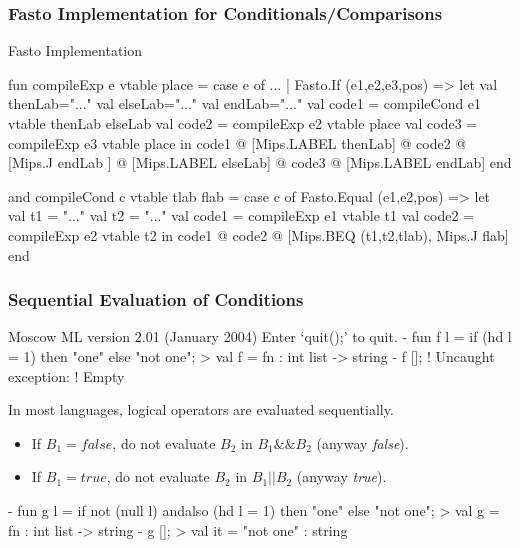 \documentclass{beamer}
\newcommand{\emp}[1]{\textcolor{DikuRed}{ #1}}
\begin{document}
\begin{frame}[fragile,t]
    \frametitle{Fasto Implementation for Conditionals/Comparisons}

\begin{block}{Fasto Implementation}
\begin{colorcode}[fontsize=\scriptsize]
fun compileExp e vtable place = case e of
      ...
    | Fasto.If (e1,e2,e3,pos) =>
        let val thenLab="..." val elseLab="..." val endLab="..."
            val code1 = compileCond e1 vtable thenLab elseLab
            val code2 = compileExp  e2 vtable place
            val code3 = compileExp  e3 vtable place
        in code1 @ [Mips.LABEL thenLab] @ code2 @ [Mips.J endLab    ] @
                   [Mips.LABEL elseLab] @ code3 @ [Mips.LABEL endLab] 
        end

and compileCond c vtable tlab flab = case c of
      Fasto.Equal (e1,e2,pos) =>
        let val t1 = "..."
            val t2 = "..."
            val code1 = compileExp e1 vtable t1
            val code2 = compileExp e2 vtable t2
        in code1 @ code2 @ [Mips.BEQ (t1,t2,tlab), Mips.J flab] 
        end
\end{colorcode} 
\end{block}

\end{frame}


\begin{frame}[fragile]
	\frametitle{Sequential Evaluation of Conditions}

\begin{colorcode}[fontsize=\scriptsize]
Moscow ML version 2.01 (January 2004)
Enter `quit();' to quit.
- fun f l = if (hd l = 1) then "one" else "not one";
> val f = fn : int list -> string
- f [];
! Uncaught exception: 
! Empty
\end{colorcode}
\pause

In most languages, 
logical operators are \emp{evaluated sequentially}.

\begin{itemize}
\item If $ B_1 = \mathit{false}$, do not evaluate $ B_2 $ in $ B_1 \&\& B_2 $ 
	(anyway \textit{false}).
\item If $ B_1 = \mathit{true}$, do not evaluate $ B_2 $ in $ B_1 || B_2 $
	(anyway \textit{true}).
\end{itemize}
\pause
\begin{colorcode}[fontsize=\scriptsize]
- fun g l = if not (null l) \alert{andalso} (hd l = 1) then "one" else "not one";
> val g = fn : int list -> string
- g [];
> val it = "not one" : string
\end{colorcode}

\end{frame}
\end{document}
